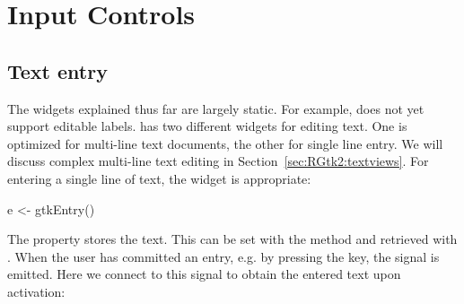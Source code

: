 




\section{Input Controls}

\subsection{Text entry}
\label{sec:RGtk2:gtkEntry}

The widgets explained thus far are largely static. For example, \GTK\/
does not yet support editable labels. \GTK\/ has two different widgets
for editing text. One is optimized for multi-line text documents, the
other for single line entry. We will discuss complex multi-line text
editing in Section~\ref{sec:RGtk2:textviews}. For entering a single
line of text, the  widget is appropriate:
\begin{Schunk}
\begin{Sinput}
 e <- gtkEntry()
\end{Sinput}
\end{Schunk}

The  property stores the text. This can be set with the
method  and retrieved with
.  When the user has committed an entry,
e.g. by pressing the  key, the  signal is
emitted. Here we connect to this signal to obtain the entered text upon
activation:
\begin{Schunk}
\end{Schunk}

